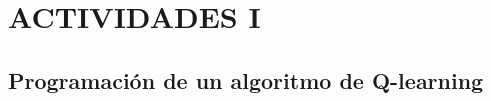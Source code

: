 \documentclass{article}
\begin{document}
\section{ACTIVIDADES I}

\subsection{Programación de un algoritmo de Q-learning}




\end{document}
